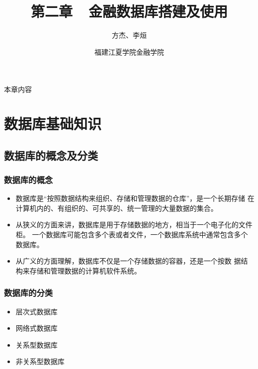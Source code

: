 \documentclass[t]{beamer}
\begin{document}
\fontsize{11}{18}\selectfont


\CTEXindent



  \title{第二章~~金融数据库搭建及使用}
\author{方杰、李烜}
\date{福建江夏学院金融学院}
  \begin{frame}
    \maketitle
  \end{frame}

\begin{frame}{本章内容}
  \begin{multicols}{2}
    \tableofcontents
  \end{multicols}
\end{frame}

\section{数据库基础知识}
\subsection{数据库的概念及分类}
\begin{frame}
    \frametitle{数据库的概念}
\begin{itemize}
  \item 数据库是“按照数据结构来组织、存储和管理数据的仓库”，是一个长期存储 在计算机内的、有组织的、可共享的、统一管理的大量数据的集合。
  \item 从狭义的方面来讲，数据库是用于存储数据的地方，相当于一个电子化的文件柜。
  一个数据库可能包含多个表或者文件，一个数据库系统中通常包含多个数据库。
  \item 从广义的方面理解，数据库不仅是一个存储数据的容器，还是一个按数 据结构来存储和管理数据的计算机软件系统。
\end{itemize}
    

\end{frame}

\begin{frame}
    \frametitle{数据库的分类}
\begin{itemize}
  \item 层次式数据库
  \item 网络式数据库
  \item {\color{red}关系型数据库}
  \item 非关系型数据库
\end{itemize}
    

\end{frame}
\end{document}
